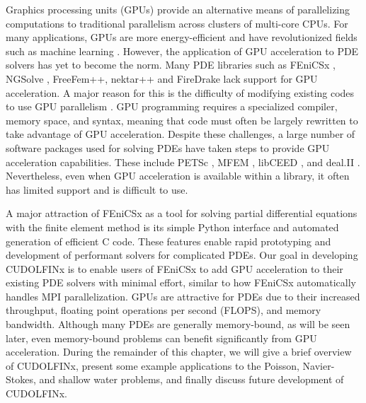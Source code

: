 Graphics processing units (GPUs) provide an alternative means of parallelizing computations to traditional parallelism across clusters of multi-core CPUs. For many applications, GPUs are more energy-efficient and have revolutionized fields such as machine learning \cite{navarro2014survey}. However, the application of GPU acceleration to PDE solvers has yet to become the norm. Many PDE libraries such as FEniCSx \cite{baratta2023dolfinx}, NGSolve \cite{schoberl2014c++}, FreeFem++\cite{hecht2012new}, nektar++ \cite{moxey2020nektar++} and FireDrake \cite{FiredrakeUserManual} lack support for GPU acceleration. A major reason for this is the difficulty of modifying existing codes to use GPU parallelism \cite{MILLS2021102831}. GPU programming requires a specialized compiler, memory space, and syntax, meaning that code must often be largely rewritten to take advantage of GPU acceleration. Despite these challenges, a large number of software packages used for solving PDEs have taken steps to provide GPU acceleration capabilities. These include PETSc \cite{MILLS2021102831}, MFEM \cite{anderson2021mfem}, libCEED \cite{abdelfattah2021gpu}, and deal.II \cite{arndt2021deal}. Nevertheless, even when GPU acceleration is available within a library, it often has limited support and is difficult to use.

A major attraction of FEniCSx \cite{baratta2023dolfinx} as a tool for solving partial differential equations with the finite element method is its simple Python interface and automated generation of efficient C code. These features enable rapid prototyping and development of performant solvers for complicated PDEs. Our goal in developing CUDOLFINx is to enable users of FEniCSx to add GPU acceleration to their existing PDE solvers with minimal effort, similar to how FEniCSx automatically handles MPI parallelization. GPUs are attractive for PDEs due to their increased throughput, floating point operations per second (FLOPS), and memory bandwidth. Although many PDEs are generally memory-bound, as will be seen later, even memory-bound problems can benefit significantly from GPU acceleration. During the remainder of this chapter, we will give a brief overview of CUDOLFINx, present some example applications to the Poisson, Navier-Stokes, and shallow water problems, and finally discuss future development of CUDOLFINx. 

